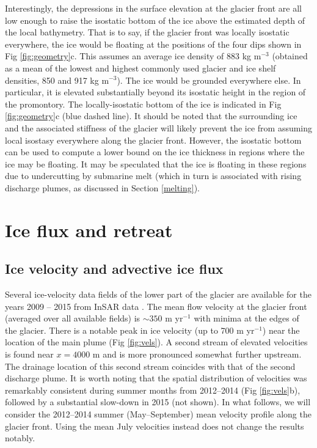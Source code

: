 \documentclass[10pt,letterpaper]{article}
\begin{document}
Interestingly, the depressions in the surface elevation at the glacier front are all low enough to raise the isostatic bottom of the ice above the estimated depth of the local bathymetry. That is to say, if the glacier front was locally isostatic everywhere, the ice would be floating at the positions of the four dips shown in Fig \ref{fig:geometry}c. This assumes an average ice density of 883 kg m$^{-3}$ (obtained as a mean of the lowest and highest commonly used glacier and ice shelf densities, 850 and 917 kg m$^{-3}$). The ice would be grounded everywhere else. In particular, it is elevated substantially beyond its isostatic height in the region of the promontory. The locally-isostatic bottom of the ice is indicated in Fig \ref{fig:geometry}c (blue dashed line). It should be noted that the surrounding ice and the associated stiffness of the glacier will likely prevent the ice from assuming local isostasy everywhere along the glacier front. However, the isostatic bottom can be used to compute a lower bound on the ice thickness in regions where the ice may be floating. It may be speculated that the ice is floating in these regions due to undercutting by submarine melt (which in turn is associated with rising discharge plumes, as discussed in Section \ref{melting}). 

\section{Ice flux and retreat}

\subsection{Ice velocity and advective ice flux} \label{vels}

Several ice-velocity data fields of the lower part of the glacier are available for the years 2009 -- 2015 from InSAR data \citep{Joughin:uFAgCs4K}. The mean flow velocity at the glacier front (averaged over all available fields) is $\sim 350$ m yr$^{-1}$ with minima at the edges of the glacier. There is a notable peak in ice velocity (up to 700 m yr$^{-1}$) near the location of the main plume (Fig \ref{fig:vels}). A second stream of elevated velocities is found near $x = 4000$ m and is more pronounced somewhat further upstream. The drainage location of this second stream coincides with that of the second discharge plume. It is worth noting that the spatial distribution of velocities was remarkably consistent during summer months from 2012--2014 (Fig  \ref{fig:vels}b), followed by a substantial slow-down in 2015 (not shown). In what follows, we will consider the 2012--2014 summer (May--September) mean velocity profile along the glacier front. Using the mean July velocities instead does not change the results notably. 
\end{document}
